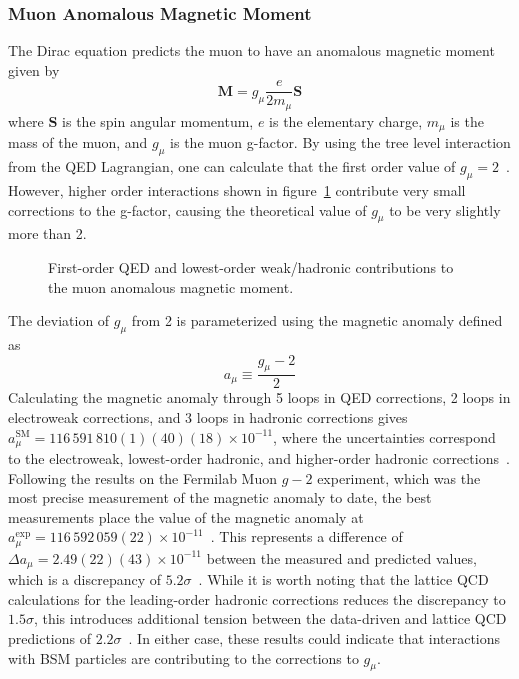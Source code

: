 \subsubsection{Muon Anomalous Magnetic Moment} \label{sec:gminus2}
The Dirac equation predicts the muon to have an anomalous magnetic moment given by
\begin{equation}
	\mathbf{M}=g_\mu\frac{e}{2m_\mu}\mathbf{S}
\end{equation}
where $\mathbf{S}$ is the spin angular momentum, $e$ is the elementary charge, $m_\mu$ is the mass of the muon, and $g_\mu$ is the muon g-factor. By using the tree level interaction from the QED Lagrangian, one can calculate that the first order value of $g_\mu=2$~\cite{gminus2_slides}. However, higher order interactions shown in figure~\ref{fig:muon_magnetic_moment} contribute very small corrections to the g-factor, causing the theoretical value of $g_\mu$ to be very slightly more than 2.
\begin{figure}[htb!]
	\begingroup
	
	
	
	\endgroup
	\caption[First-order QED and lowest-order weak/hadronic contributions to the muon anomalous magnetic moment.]{First-order QED and lowest-order weak/hadronic contributions to the muon anomalous magnetic moment.}
	\label{fig:muon_magnetic_moment}
\end{figure}
The deviation of $g_\mu$ from 2 is parameterized using the magnetic anomaly defined as
\begin{equation}
	a_\mu\equiv\frac{g_\mu-2}{2}
\end{equation}
Calculating the magnetic anomaly through 5 loops in QED corrections, 2 loops in electroweak corrections, and 3 loops in hadronic corrections gives $a_\mu^\text{SM}=116\,591\,810(1)(40)(18)\times10^{-11}$, where the uncertainties correspond to the electroweak, lowest-order hadronic, and higher-order hadronic corrections~\cite{pdg2024}. Following the results on the Fermilab Muon $g-2$ experiment, which was the most precise measurement of the magnetic anomaly to date, the best measurements place the value of the magnetic anomaly at $a_\mu^\text{exp}=116\,592\,059(22)\times10^{-11}$~\cite{gminus2}. This represents a difference of $\Delta a_\mu=2.49(22)(43)\times10^{-11}$ between the measured and predicted values, which is a discrepancy of $5.2\sigma$~\cite{pdg2024}. While it is worth noting that the lattice QCD calculations for the leading-order hadronic corrections reduces the discrepancy to $1.5\sigma$, this introduces additional tension between the data-driven and lattice QCD predictions of $2.2\sigma$~\cite{gminus2_latticeqcd}. In either case, these results could indicate that interactions with BSM particles are contributing to the corrections to $g_\mu$.

